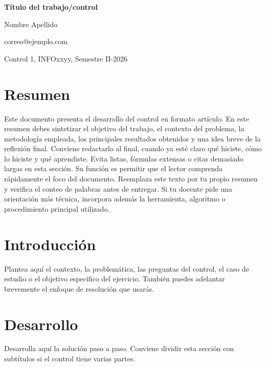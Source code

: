 \documentclass[10pt,letterpaper]{article}
\makeatletter
\newcommand{\TituloTrabajo}{Título del trabajo/control}
\newcommand{\NombreEstudianteUno}{Nombre Apellido}
\newcommand{\CorreoUno}{correo@ejemplo.com}
\newcommand{\ControlNumero}{Control 1}
\newcommand{\CodigoCurso}{INFOxxyy}
\newcommand{\Semestre}{Semestre II-2026}
\makeatother
\begin{document}
{\LARGE\bfseries \TituloTrabajo\par}

\vspace{0.3em}
{\normalsize \NombreEstudianteUno\par}
{\normalsize \CorreoUno\par}

{\normalsize \ControlNumero, \CodigoCurso, \Semestre\par}

\vspace{0.8em}

\section*{Resumen}
Este documento presenta el desarrollo del control en formato artículo. En este resumen debes sintetizar el objetivo del trabajo, el contexto del problema, la metodología empleada, los principales resultados obtenidos y una idea breve de la reflexión final. Conviene redactarlo al final, cuando ya esté claro qué hiciste, cómo lo hiciste y qué aprendiste. Evita listas, fórmulas extensas o citas demasiado largas en esta sección. Su función es permitir que el lector comprenda rápidamente el foco del documento. Reemplaza este texto por tu propio resumen y verifica el conteo de palabras antes de entregar. Si tu docente pide una orientación más técnica, incorpora además la herramienta, algoritmo o procedimiento principal utilizado.

\section*{Introducción}
Plantea aquí el contexto, la problemática, las preguntas del control, el caso de estudio o el objetivo específico del ejercicio. También puedes adelantar brevemente el enfoque de resolución que usarás.

\section*{Desarrollo}
Desarrolla aquí la solución paso a paso. Conviene dividir esta sección con subtítulos si el control tiene varias partes.
\end{document}
